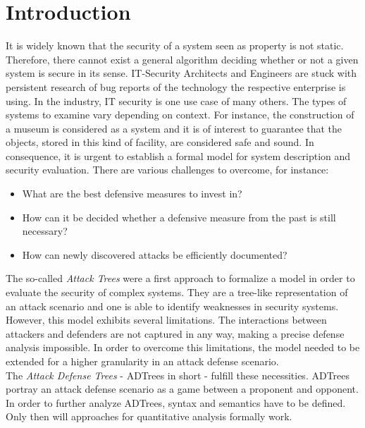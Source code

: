 \documentclass[conference]{IEEEtran}
\begin{document}
\section{Introduction}
It is widely known that the security of a system seen as property is not static. Therefore, there cannot exist a general algorithm deciding whether or not a given system is secure in its sense. IT-Security Architects and Engineers are stuck with persistent research of bug reports of the technology the respective enterprise is using. In the industry, IT security is one use case of many others. The types of systems to examine vary depending on context. For instance, the construction of a museum is considered as a system and it is of interest to guarantee that the objects, stored in this kind of facility, are considered safe and sound. In consequence, it is urgent to establish a formal model for system description and security evaluation. There are various challenges to overcome, for instance:
\begin{itemize}
	\item What are the best defensive measures to invest in?
	\item How can it be decided whether a defensive measure from the past is still necessary?
	\item How can newly discovered attacks be efficiently documented?
\end{itemize}
%
%
The so-called \textit{Attack Trees} were a first approach to formalize a model in order to evaluate the security of complex systems. They are a tree-like representation of an attack scenario and one is able to identify weaknesses in security systems. However, this model exhibits several limitations. The interactions between attackers and defenders are not captured in any way, making a precise defense analysis impossible. In order to overcome this limitations, the model needed to be extended for a higher granularity in an attack defense scenario.\\
The \textit{Attack Defense Trees} - ADTrees in short - fulfill these necessities. ADTrees portray an attack defense scenario as a game between a proponent and opponent. In order to further analyze ADTrees, syntax and semantics have to be defined. Only then will approaches for quantitative analysis formally work.
\end{document}

